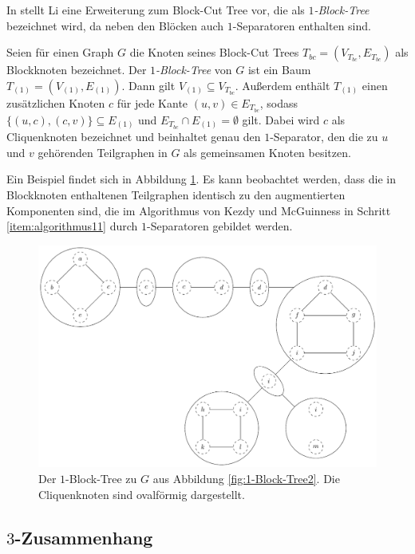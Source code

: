 In \cite{Li11} stellt Li eine Erweiterung zum Block-Cut Tree vor, die als \emph{$1$-Block-Tree} bezeichnet wird, da neben den Blöcken auch $1$-Separatoren enthalten sind.

\begin{definition}
  Seien für einen Graph $G$ die Knoten seines Block-Cut Trees $T_{bc} = (V_{T_{bc}}, E_{T_{bc}})$ als Blockknoten bezeichnet.
  Der \emph{$1$-Block-Tree} von $G$ ist ein Baum $T_{(1)} = (V_{(1)}, E_{(1)})$.
  Dann gilt $V_{(1)} \subseteq V_{T_{bc}}$.
  Außerdem enthält $T_{(1)}$ einen zusätzlichen Knoten $c$ für jede Kante $(u, v) \in E_{T_{bc}}$, sodass $\{(u, c), (c, v)\} \subseteq E_{(1)}$ und $E_{T_{bc}} \cap E_{(1)} = \emptyset$ gilt.
  Dabei wird $c$ als Cliquenknoten bezeichnet und beinhaltet genau den $1$-Separator, den die zu $u$ und $v$ gehörenden Teilgraphen in $G$ als gemeinsamen Knoten besitzen.
\end{definition}

Ein Beispiel findet sich in Abbildung \ref{fig:1-Block-Tree3}.
Es kann beobachtet werden, dass die in Blockknoten enthaltenen Teilgraphen identisch zu den augmentierten Komponenten sind, die im Algorithmus von Kezdy und McGuinness in Schritt \ref{item:algorithmus11} durch $1$-Separatoren gebildet werden.
\begin{figure}[H]
  \centering
  \includegraphics[width=\textwidth,height=\textheight,keepaspectratio]{bilder/1-Block-Tree3.pdf}
  \caption{Der $1$-Block-Tree zu $G$ aus Abbildung \ref{fig:1-Block-Tree2}.
           Die Cliquenknoten sind ovalförmig dargestellt.}
  \label{fig:1-Block-Tree3}
\end{figure}


\subsection{$3$-Zusammenhang}

